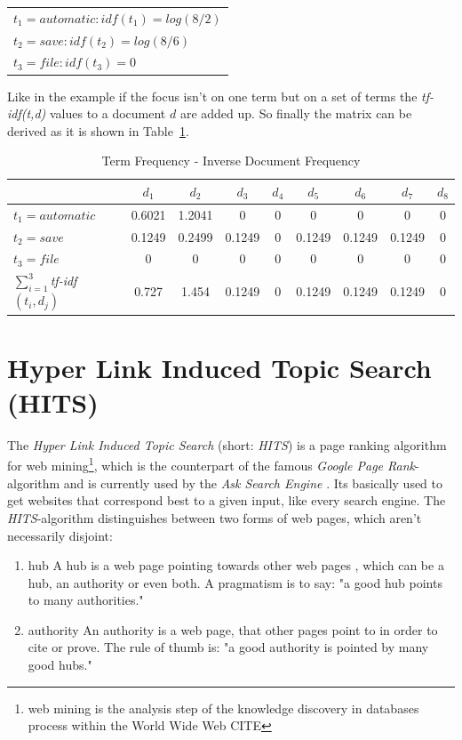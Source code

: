 \begin{table}[h]
  \centering
  \begin{tabular}{l}
    $t_1 = automatic : idf(t_1) = log(8/2)$  \\
    $t_2 = save : idf(t_2)=log(8/6)$ \\
    $t_3 = file : idf(t_3)=0$ 
 \end{tabular}
\end{table}

Like in the example if the focus isn't on one term but on a set of terms the \emph{tf-idf(t,d)} values to a document $d$ are added up. So finally the matrix can be derived as it is shown in Table~\ref{tfidf_table}.

\begin{table}[h]
  \centering
  \begin{tabular}{| l | c | c | c | c | c | c | c | c |}
    \hline
    & $d_1$ & $d_2$ & $d_3$ & $d_4$ & $d_5$ & $d_6$ & $d_7$ & $d_8$ \\ \hline
    $t_1 = automatic$ & 0.6021 & 1.2041 & 0 & 0 & 0 & 0 & 0 & 0 \\ \hline
    $t_2 = save$ & 0.1249 & 0.2499 & 0.1249 &0 & 0.1249 & 0.1249 & 0.1249 & 0 \\ \hline
    $t_3 = file $ & 0 & 0 & 0 & 0 & 0 & 0 & 0 & 0 \\ \hline \hline
    $\sum\nolimits_{i=1}^3$\emph{tf-idf}$(t_i,d_j)$ & 0.727 & 1.454 & 0.1249 & 0 & 0.1249 & 0.1249 & 0.1249 & 0\\ \hline
  \end{tabular}
  \label{tfidf_table}
  \caption{Term Frequency - Inverse Document Frequency}
\end{table}

\section{Hyper Link Induced Topic Search (HITS)}

The \emph{Hyper Link Induced Topic Search} (short: \emph{HITS}) is a page ranking algorithm for web mining\footnote{\label{foot:1}web mining is the analysis step of the knowledge discovery in databases process within the World Wide Web CITE}, which is the counterpart of the famous \emph{Google Page Rank}-algorithm and is currently used by the \emph{Ask Search Engine} \cite{wiki:HITS}. Its basically used to get websites that correspond best to a given input, like every search engine. 
The \emph{HITS}-algorithm distinguishes between two forms of web pages, which aren't necessarily disjoint:
\begin{enumerate}
  \item hub \newline
  A hub is a web page pointing towards other web pages , which can be a hub, an authority or even both. A pragmatism is to say: "a good hub points to many authorities."
  \item authority \newline
  An authority is a web page, that other pages point to in order to cite or prove. The rule of thumb is: "a good authority is pointed by many good hubs."
\end{enumerate}

